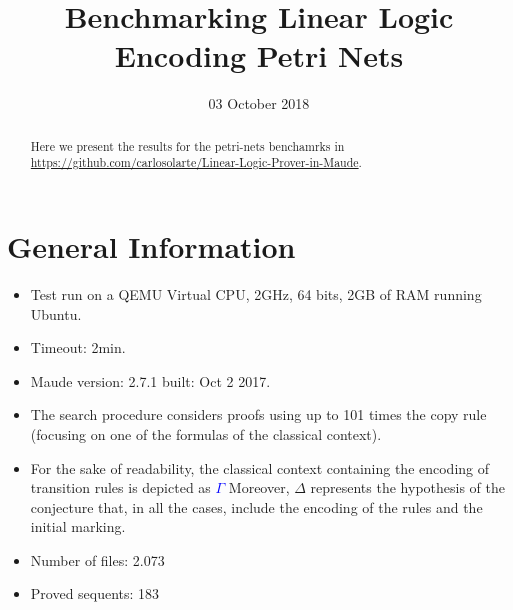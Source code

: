 \documentclass{article}
\title{Benchmarking Linear Logic\\ Encoding Petri Nets}
\date{03 October 2018}
\newcommand\blue[2]{\textcolor{blue}{#1}}
\begin{document}
\maketitle
\begin{abstract}
Here we present the results  for the petri-nets benchamrks in \url{https://github.com/carlosolarte/Linear-Logic-Prover-in-Maude}.
\end{abstract}

\section{General Information}
\begin{itemize}
 \item Test run on a QEMU Virtual CPU, 2GHz, 64 bits, 2GB of RAM running Ubuntu. 
\item Timeout: 2min. 
\item Maude version: 2.7.1 built: Oct 2 2017.
\item The search procedure considers proofs  using up to 101 times the copy rule (focusing on one of the formulas of the classical context).
\item For the sake of readability, the classical context containing the encoding of transition rules is depicted as \blue{$\Gamma$} . Moreover, $\Delta$ represents the hypothesis of the conjecture that, in all the cases, include the encoding of the rules and the initial marking. 
\item Number of files: 2.073
\item Proved sequents: 183 

\end{itemize}
\end{document}
